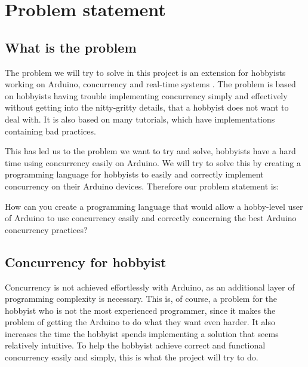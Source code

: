 \section{Problem statement}\label{sec:problemstatement}

\subsection{What is the problem}\label{sec:whatistheproblem}
The problem we will try to  solve in this project is an extension for hobbyists working on Arduino, concurrency and real-time systems . The problem is based on hobbyists having trouble implementing concurrency simply and effectively without getting into the nitty-gritty details, that a hobbyist does not want to deal with. It is also based on many tutorials, which have implementations containing bad practices.%

This has led us to the problem we want to try and solve, hobbyists have a hard time using concurrency easily on Arduino. We will try to solve this by creating a programming language for hobbyists to easily and correctly implement concurrency on their Arduino devices. Therefore our problem statement is:

How can you create a programming language that would allow a hobby-level user of Arduino to use concurrency easily and correctly concerning the best Arduino concurrency practices?


\subsection{Concurrency for hobbyist} 
Concurrency is not achieved effortlessly with Arduino, as an additional layer of programming complexity is necessary. This is, of course, a problem for the hobbyist who is not the most experienced programmer, since it makes the problem of getting the Arduino to do what they want even harder. It also increases the time the hobbyist spends implementing a solution that seems relatively intuitive. To help the hobbyist achieve correct and functional concurrency easily and simply, this is what the project will try to do.


